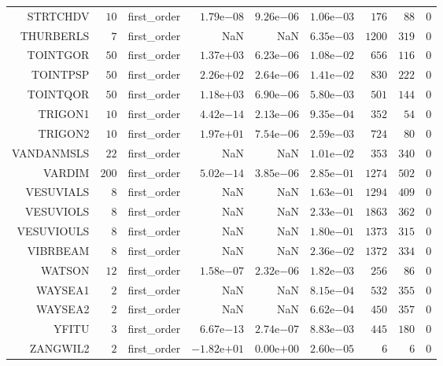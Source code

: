 \begin{longtable}{rrrrrrrrr}
STRTCHDV & \(    10\) & first\_order & \( 1.79\)e\(-08\) & \( 9.26\)e\(-06\) & \( 1.06\)e\(-03\) & \(   176\) & \(    88\) & \(     0\) \\
THURBERLS & \(     7\) & first\_order &       NaN &       NaN & \( 6.35\)e\(-03\) & \(  1200\) & \(   319\) & \(     0\) \\
TOINTGOR & \(    50\) & first\_order & \( 1.37\)e\(+03\) & \( 6.23\)e\(-06\) & \( 1.08\)e\(-02\) & \(   656\) & \(   116\) & \(     0\) \\
TOINTPSP & \(    50\) & first\_order & \( 2.26\)e\(+02\) & \( 2.64\)e\(-06\) & \( 1.41\)e\(-02\) & \(   830\) & \(   222\) & \(     0\) \\
TOINTQOR & \(    50\) & first\_order & \( 1.18\)e\(+03\) & \( 6.90\)e\(-06\) & \( 5.80\)e\(-03\) & \(   501\) & \(   144\) & \(     0\) \\
TRIGON1 & \(    10\) & first\_order & \( 4.42\)e\(-14\) & \( 2.13\)e\(-06\) & \( 9.35\)e\(-04\) & \(   352\) & \(    54\) & \(     0\) \\
TRIGON2 & \(    10\) & first\_order & \( 1.97\)e\(+01\) & \( 7.54\)e\(-06\) & \( 2.59\)e\(-03\) & \(   724\) & \(    80\) & \(     0\) \\
VANDANMSLS & \(    22\) & first\_order &       NaN &       NaN & \( 1.01\)e\(-02\) & \(   353\) & \(   340\) & \(     0\) \\
VARDIM & \(   200\) & first\_order & \( 5.02\)e\(-14\) & \( 3.85\)e\(-06\) & \( 2.85\)e\(-01\) & \(  1274\) & \(   502\) & \(     0\) \\
VESUVIALS & \(     8\) & first\_order &       NaN &       NaN & \( 1.63\)e\(-01\) & \(  1294\) & \(   409\) & \(     0\) \\
VESUVIOLS & \(     8\) & first\_order &       NaN &       NaN & \( 2.33\)e\(-01\) & \(  1863\) & \(   362\) & \(     0\) \\
VESUVIOULS & \(     8\) & first\_order &       NaN &       NaN & \( 1.80\)e\(-01\) & \(  1373\) & \(   315\) & \(     0\) \\
VIBRBEAM & \(     8\) & first\_order &       NaN &       NaN & \( 2.36\)e\(-02\) & \(  1372\) & \(   334\) & \(     0\) \\
WATSON & \(    12\) & first\_order & \( 1.58\)e\(-07\) & \( 2.32\)e\(-06\) & \( 1.82\)e\(-03\) & \(   256\) & \(    86\) & \(     0\) \\
WAYSEA1 & \(     2\) & first\_order &       NaN &       NaN & \( 8.15\)e\(-04\) & \(   532\) & \(   355\) & \(     0\) \\
WAYSEA2 & \(     2\) & first\_order &       NaN &       NaN & \( 6.62\)e\(-04\) & \(   450\) & \(   357\) & \(     0\) \\
YFITU & \(     3\) & first\_order & \( 6.67\)e\(-13\) & \( 2.74\)e\(-07\) & \( 8.83\)e\(-03\) & \(   445\) & \(   180\) & \(     0\) \\
ZANGWIL2 & \(     2\) & first\_order & \(-1.82\)e\(+01\) & \( 0.00\)e\(+00\) & \( 2.60\)e\(-05\) & \(     6\) & \(     6\) & \(     0\) \\\hline
\end{longtable}
